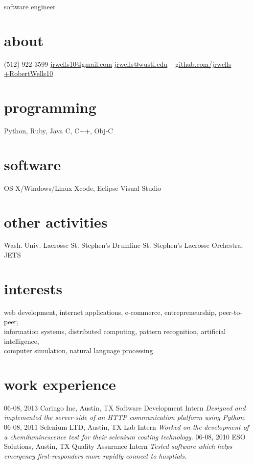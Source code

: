 \documentclass[]{cv}
\begin{document}
       {software engineer}

\begin{aside}
  \section{about}
    (512) 922-3599
    \href{mailto:jrwells10@gmail.com}{jrwells10@gmail.com}
    \href{mailto:jrwells@wustl.edu}{jrwells@wustl.edu}
    ~
    \href{http://github.com/jrwells}{github.com/jrwells}
    \href{http://google.com/+RobertWells10}{+RobertWells10}
  \section{programming}
    Python, Ruby, Java
    C, C++, Obj-C
  \section{software}
    OS X/Windows/Linux
    Xcode, Eclipse
    Visual Studio
  \section{other activities}
    Wash. Univ. Lacrosse
    St. Stephen's Drumline
    St. Stephen's Lacrosse
    Orchestra, JETS
\end{aside}

\section{interests}

web development, internet applications, e-commerce, entrepreneurship, peer-to-peer, \\
information systems, distributed computing, pattern recognition, artificial intelligence, \\
computer simulation, natural language processing

\section{work experience}

\begin{entrylist}
  \entry
    {06-08, 2013}
    {Caringo Inc, Austin, TX}
    {Software Development Intern}
    {\emph{Designed and implemented the server-side of an HTTP communication platform using Python.}}
  \entry
    {06-08, 2011}
    {Selenium LTD, Austin, TX}
    {Lab Intern}
    {\emph{Worked on the development of a chemiluminescence test for their selenium coating technology.}}
  \entry
    {06-08, 2010}
    {ESO Solutions, Austin, TX}
    {Quality Assurance Intern}
    {\emph{Tested software which helps emergency first-responders more rapidly connect to hosptials.}}
\end{entrylist}
\end{document}
